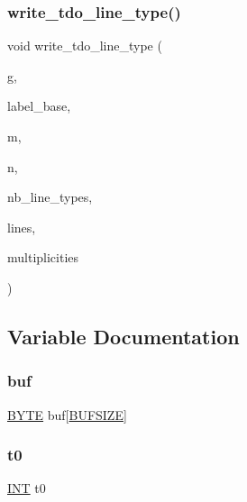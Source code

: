 \subsubsection{\texorpdfstring{write\+\_\+tdo\+\_\+line\+\_\+type()}{write\_tdo\_line\_type()}}
{\footnotesize\ttfamily void write\+\_\+tdo\+\_\+line\+\_\+type (\begin{DoxyParamCaption}\item[{ofstream \&}]{g,  }\item[{\mbox{\hyperlink{galois_8h_ab6cc7b4aeb6ea31aba2b3fbfc83ff5e6}{B\+Y\+TE}} $\ast$}]{label\+\_\+base,  }\item[{\mbox{\hyperlink{galois_8h_a09fddde158a3a20bd2dcadb609de11dc}{I\+NT}}}]{m,  }\item[{\mbox{\hyperlink{galois_8h_a09fddde158a3a20bd2dcadb609de11dc}{I\+NT}}}]{n,  }\item[{\mbox{\hyperlink{galois_8h_a09fddde158a3a20bd2dcadb609de11dc}{I\+NT}}}]{nb\+\_\+line\+\_\+types,  }\item[{\mbox{\hyperlink{galois_8h_a09fddde158a3a20bd2dcadb609de11dc}{I\+NT}} $\ast$}]{lines,  }\item[{\mbox{\hyperlink{galois_8h_a09fddde158a3a20bd2dcadb609de11dc}{I\+NT}} $\ast$}]{multiplicities }\end{DoxyParamCaption})}



\subsection{Variable Documentation}
\mbox{\label{tdo__start_8_c_a271269b6eb6a530467c611f562cad9ee}} 
\subsubsection{\texorpdfstring{buf}{buf}}
{\footnotesize\ttfamily \mbox{\hyperlink{galois_8h_ab6cc7b4aeb6ea31aba2b3fbfc83ff5e6}{B\+Y\+TE}} buf\mbox{[}\mbox{\hyperlink{galois_8h_aeca034f67218340ecb2261a22c2f3dcd}{B\+U\+F\+S\+I\+ZE}}\mbox{]}}

\mbox{\label{tdo__start_8_c_a4268f4fe222ffb119218a0199f5e1904}} 
\subsubsection{\texorpdfstring{t0}{t0}}
{\footnotesize\ttfamily \mbox{\hyperlink{galois_8h_a09fddde158a3a20bd2dcadb609de11dc}{I\+NT}} t0}

